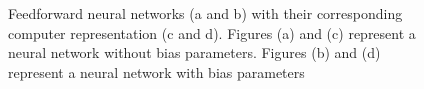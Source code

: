 \documentclass[11pt]{article}
\begin{document}
\begin{figure}[t]
	\centering
		\hspace{2mm}

		\hspace{8mm} 
		\caption{Feedforward neural networks (a and b) with their corresponding computer representation (c and d). Figures (a) and (c) represent a neural network without bias parameters. Figures (b) and (d) represent a neural network with bias parameters}
	\label{fig:figures_ffwdnn_DS}	
\end{figure}
\end{document}
